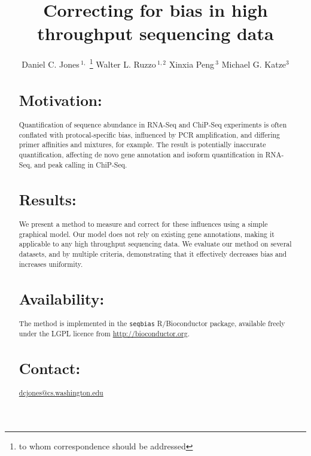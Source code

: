 \documentclass{bioinfo}
\begin{document}

\title{Correcting for bias in high throughput sequencing data}
\author[Jones \textit{et~al}]
{Daniel C. Jones\,$^{1,}$
\footnote{to whom correspondence should be addressed}\hspace{0.5em}
Walter L. Ruzzo\,$^{1,2}$
Xinxia Peng\,$^{3}$
Michael G. Katze$^{3}$
}


\address{
$^{1}$Deportment of Computer Science and Engineering, University of
Washington, Seattle, WA 98195-2350, USA\\
$^{2}$Fred Hutchinson Cancer Research Center, Seattle, WA 98109, USA\\
$^{3}$Department of Microbiology, University of Washington, Seattle, WA
98195-7242, USA}


\maketitle

\begin{abstract}

\section{Motivation:}

Quantification of sequence abundance in RNA-Seq and ChiP-Seq experiments is
often conflated with protocal-specific bias, influenced by PCR amplification,
and differing primer affinities and mixtures, for example. The result is
potentially inaccurate quantification, affecting de novo gene annotation and
isoform quantification in RNA-Seq, and peak calling in ChiP-Seq.


\section{Results:}

We present a method to measure and correct for these influences using a simple
graphical model. Our model does not rely on existing gene annotations, making it
applicable to any high throughput sequencing data. We evaluate our method on
several datasets, and by multiple criteria, demonstrating that it effectively
decreases bias and increases uniformity.


\section{Availability:}
The method is implemented in the \texttt{seqbias} R/Bioconductor package,
available freely under the LGPL licence from
\href{http://bioconductor.org}{http://bioconductor.org}.


\section{Contact:}
\href{dcjones@cs.washington.edu}{dcjones@cs.washington.edu}

\end{abstract}
\end{document}
